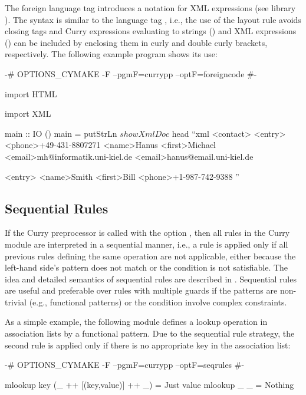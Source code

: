 The foreign language tag  introduces a notation
for XML expressions (see \CYS library ).
The syntax is similar to the language tag ,
i.e., the use of the layout rule avoids closing tags
and Curry expressions evaluating to strings ()
and XML expressions () can be included by enclosing
them in curly and double curly brackets, respectively.
The following example program shows its use:
\begin{currynomath}
{-# OPTIONS_CYMAKE -F --pgmF=currypp --optF=foreigncode #-}

import HTML

import XML

main :: IO ()
main = putStrLn $ showXmlDoc $ head ``xml
 <contact>
  <entry>
   <phone>+49-431-8807271
   <name>Hanus
   <first>Michael
   <email>mh@informatik.uni-kiel.de
   <email>hanus@email.uni-kiel.de
   
  <entry>
   <name>Smith
   <first>Bill
   <phone>+1-987-742-9388
 ''
\end{currynomath}


\subsection{Sequential Rules}

If the Curry preprocessor is called with the option
, then all rules in the Curry module are
interpreted in a sequential manner, i.e., a rule is applied only
if all previous rules defining the same operation are not applicable,
either because the left-hand side's pattern does not match
or the condition is not satisfiable.
The idea and detailed semantics of
sequential rules are described in \cite{AntoyHanus14}.
Sequential rules are useful and preferable over
rules with multiple guards if the patterns are non-trivial
(e.g., functional patterns) or the condition involve complex
constraints.

As a simple example, the following module defines
a lookup operation in association lists by a functional pattern.
Due to the sequential rule strategy,
the second rule is applied only if there is no appropriate
key in the association list:
%
\begin{curry}
{-# OPTIONS_CYMAKE -F --pgmF=currypp --optF=seqrules #-}

mlookup key (_ ++ [(key,value)] ++ _) = Just value
mlookup _   _                         = Nothing 
\end{curry}


